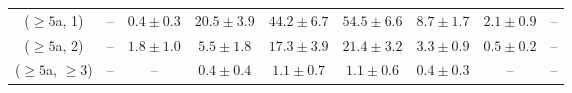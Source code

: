 \begin{table}[h!]
{\begin{tabular}{ccccccccc}
	($\ge5$a, 1) & -- & $0.4\pm 0.3$ & $20.5\pm 3.9$ & $44.2\pm 6.7$ & $54.5\pm 6.6$ & $8.7\pm 1.7$ & $2.1\pm 0.9$ & -- \\[0.5ex] 
	($\ge5$a, 2) & -- & $1.8\pm 1.0$ & $5.5\pm 1.8$ & $17.3\pm 3.9$ & $21.4\pm 3.2$ & $3.3\pm 0.9$ & $0.5\pm 0.2$ & -- \\[0.5ex] 
	($\ge5$a, $\ge3$) & -- & -- & $0.4\pm 0.4$ & $1.1\pm 0.7$ & $1.1\pm 0.6$ & $0.4\pm 0.3$ & -- & -- \\[0.5ex] 
	\hline
	\hline
\end{tabular}}
\end{table}
